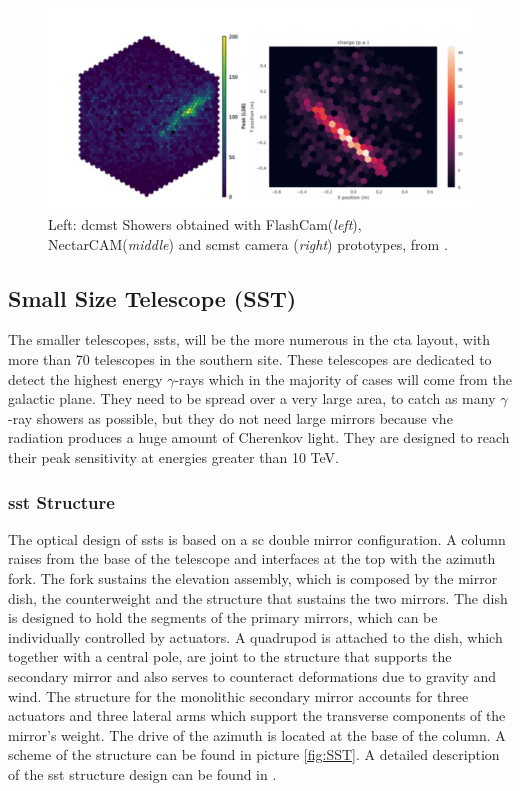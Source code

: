 \documentclass[main.tex]{subfiles}
\begin{document}
\begin{figure}
\centering
 \includegraphics[width=\textwidth]{Pictures/showerimagesMST.pdf}
  \caption{Left: \gls{dcmst} Showers obtained with FlashCam(\textit{left}), NectarCAM(\textit{middle}) and \gls{scmst} camera (\textit{right}) prototypes, from \cite{2019MSTreport}.}
    \label{fig:MSTcamerasimg}
\end{figure}

\subsection{Small Size Telescope (SST)}

The smaller telescopes, \glspl{sst}, will be the more numerous in the \gls{cta} layout, with more than 70 telescopes in the southern site. These telescopes are dedicated to detect the highest energy $\gamma$-rays which in the majority of cases will come from the galactic plane. They need to be spread over a very large area, to catch as many $\gamma$-ray showers as possible, but they do not need large mirrors because \gls{vhe} radiation produces a huge amount of Cherenkov light. They are designed to reach their peak sensitivity at energies greater than 10 TeV.

\subsubsection{\gls{sst} Structure}

The optical design of \glspl{sst} is based on a \gls{sc} double mirror configuration. A column raises from the base of the telescope and interfaces at the top with the azimuth fork. The fork sustains the elevation assembly, which is composed by the mirror dish, the counterweight and the structure that sustains the two mirrors. The dish is designed to hold the segments of the primary mirrors, which can be individually controlled by actuators. A quadrupod is attached to the dish, which together with a central pole, are joint to the structure that supports the secondary mirror and also serves to counteract deformations due to gravity and wind. The structure for the monolithic secondary mirror accounts for three actuators and three lateral arms which support the transverse components of the mirror's weight. The drive of the azimuth is located at the base of the column. A scheme of the structure can be found in picture \ref{fig:SST}. A detailed description of the \gls{sst} structure design can be found in \cite{2013SSTstruct}.
\end{document}
